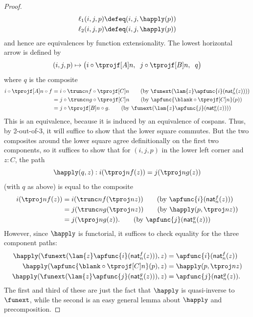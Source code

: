 \begin{proof}
\begin{align*}
    \ell_1(i,j,p) &\defeq (i,j,\happly(p))\\
    \ell_2(i,j,p) &\defeq (i,j,\happly(p))
  \end{align*}
  and hence are equivalences by function extensionality.
  The lowest horizontal arrow is defined by
  \[ (i,j,p) \mapsto \big( i\circ \tprojf[A]n,\;\; j \circ \tprojf[B] n,\;\; q\big) \]
  where $q$ is the composite
  \begin{align}
    i\circ \tprojf[A]n \circ f
    &= i\circ \trunc nf \circ \tprojf[C]n
    \tag{by $\funext(\lam{z} \apfunc{i}(\mathsf{nat}^f_n(z)))$}\\
    &= j\circ \trunc ng \circ \tprojf[C]n
    \tag{by $\apfunc{\blank\circ \tprojf[C] n}(p)$}\\
    &= j\circ \tprojf[B]n \circ g.
    \tag{by $\funext(\lam{z} \apfunc{j}(\mathsf{nat}^g_n(z)))$}
  \end{align}
  This is an equivalence, because it is induced by an equivalence of cospans.
  Thus, by 2-out-of-3, it will suffice to show that the lower square commutes.
  But the two composites around the lower square agree definitionally on the first two components, so it suffices to show that for $(i,j,p)$ in the lower left corner and $z:C$, the path
  \[ \happly(q,z) : i(\tproj n{f(z)}) = j(\tproj n{g(z)}) \]
  (with $q$ as above)
  is equal to the composite
  \begin{align}
    i(\tproj n{f(z)})
    &= i(\trunc nf(\tproj nz))
    \tag{by $\apfunc{i}(\mathsf{nat}^f_n(z))$}\\
    &= j(\trunc ng(\tproj nz))
    \tag{by $\happly(p,\tproj nz)$}\\
    &= j(\tproj n{g(z)}).
    \tag{by $\apfunc{j}(\mathsf{nat}^g_n(z))$}
  \end{align}
  However, since $\happly$ is functorial, it suffices to check equality for the three component paths:
  \begin{align*}
    \happly({\funext(\lam{z} \apfunc{i}(\mathsf{nat}^f_n(z)))},z)
    &= {\apfunc{i}(\mathsf{nat}^f_n(z))}\\
    \happly(\apfunc{\blank\circ \tprojf[C] n}(p), z)
    &= {\happly(p,\tproj nz)}\\
    \happly({\funext(\lam{z} \apfunc{j}(\mathsf{nat}^g_n(z)))},z)
    &= {\apfunc{j}(\mathsf{nat}^g_n(z))}.
  \end{align*}
  The first and third of these are just the fact that $\happly$ is quasi-inverse to $\funext$, while
  the second is an easy general lemma about $\happly$ and precomposition.
\end{proof}
